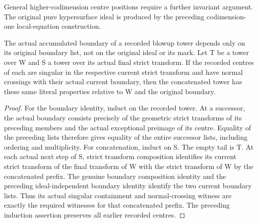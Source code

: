 General higher-codimension centre positions require a further invariant
argument. The original pure hypersurface ideal is produced by the
preceding codimension-one local-equation construction.

\begin{lemma}
\label{hir:actual-stage-centres-concatenation}
\leanok
The actual accumulated boundary of a recorded blowup tower depends only
on its original boundary list, not on the original ideal or its mark.
Let T be a tower over W and S a tower over its actual final strict
transform. If the recorded centres of each are singular in the respective
current strict transform and have normal crossings with their actual
current boundary, then the concatenated tower has these same literal
properties relative to W and the original boundary.
\end{lemma}
\begin{proof}
For the boundary identity, induct on the recorded tower. At a successor,
the actual boundary consists precisely of the geometric strict transforms
of its preceding members and the actual exceptional preimage of its centre.
Equality of the preceding lists therefore gives equality of the entire
successor lists, including ordering and multiplicity. For concatenation,
induct on S. The empty tail is T. At each actual next step of S, strict
transform composition identifies its current strict transform of the
final transform of W with the strict transform of W by the concatenated
prefix. The genuine boundary composition identity and the preceding
ideal-independent boundary identity identify the two current boundary
lists. Thus its actual singular containment and normal-crossing witness
are exactly the required witnesses for that concatenated prefix. The
preceding induction assertion preserves all earlier recorded centres.
\end{proof}

